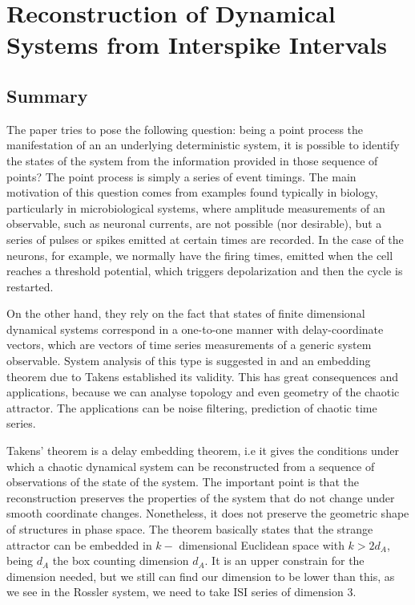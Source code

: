 \documentclass[10pt]{article}
\begin{document}
\section{Reconstruction of Dynamical Systems from Interspike Intervals}

\subsection{Summary}

The paper \cite{interspike} tries to pose the following question: being a point process the manifestation of an an underlying deterministic system, it is possible to identify the states of the system from the information provided in those sequence of points? The point process is simply a series of event timings. The main motivation of this question comes from examples found typically in biology, particularly in microbiological systems, where amplitude measurements of an observable, such as neuronal currents, are not possible (nor desirable), but a series of pulses or spikes emitted at certain times are recorded. In the case of the neurons, for example, we normally have the firing times, emitted when the cell reaches a threshold potential, which triggers depolarization and then the cycle is restarted.

On the other hand, they rely on the fact that states of finite dimensional dynamical systems correspond in a one-to-one manner with delay-coordinate vectors, which are vectors of time series measurements of a generic system observable. System analysis of this type is suggested in and an embedding theorem due to Takens established its validity. This has great consequences and applications, because we can analyse topology and even geometry of the chaotic attractor. The applications can be noise filtering, prediction of chaotic time series.

Takens' theorem \cite{takens} is a delay embedding theorem, i.e it gives the conditions under which a chaotic dynamical system can be reconstructed from a sequence of observations of the state of the system. The important point is that the reconstruction preserves the properties of the system that do not change under smooth coordinate changes. Nonetheless, it does not preserve the geometric shape of structures in phase space. The theorem basically states that the strange attractor can be embedded in $k-$ dimensional Euclidean space with $k>2d_A$, being $d_A$ the box counting dimension $d_A$. It is an upper constrain for the dimension needed, but we still can find our dimension to be lower than this, as we see in the Rossler system, we need to take ISI series of dimension 3.
\end{document}
